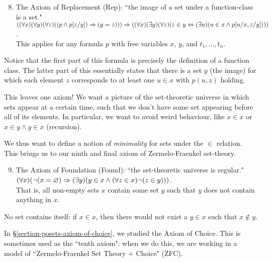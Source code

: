 \documentclass{article}
\begin{document}
\begin{enumerate}
	\setcounter{enumi}{7}
    \item The Axiom of Replacement (Rep): ``the image of a set under a function-class is a set." \\
    $((\forall x)(\forall y)(\forall z)((p \land p[z/y]) \Rightarrow (y = z))) \Rightarrow ((\forall x)(\exists y)(\forall z)(z \in y \Leftrightarrow (\exists u)(u \in x \land p[u/x, z/y])))$. \\
    This applies for any formula $p$ with free variables $x$, $y$, and $t_1, \dots, t_n$.
\end{enumerate}

Notice that the first part of this formula is precisely the definition of a function class. The latter part of this essentially states that there is a set $y$ (the image) for which each element $z$ corresponds to at least one $u \in x$ with $p(u, z)$ holding.

This leaves one axiom! We want a picture of the set-theoretic universe in which sets appear at a certain time, such that we don't have some set appearing before all of its elements. In particular, we want to avoid weird behaviour, like $x \in x$ or $x \in y \land y \in x$ (recursion).

We thus want to define a notion of \textit{minimality} for sets under the $\in$ relation. This brings us to our ninth  and final axiom of Zermelo-Fraenkel set-theory.

\begin{enumerate}
	\setcounter{enumi}{8}
    \item The Axiom of Foundation (Found): ``the set-theoretic universe is regular." \\
    $(\forall x)(\lnot (x = \varnothing) \Rightarrow (\exists y)(y \in x \land (\forall z \in x)\lnot (z \in y)))$. \\
    That is, all non-empty sets $x$ contain some set $y$ such that $y$ does not contain anything in $x$.
\end{enumerate}

\begin{corollary}
    No set contains itself: if $x \in x$, then there would not exist a $y \in x$ such that $x \notin y$.
\end{corollary}

In \S\ref{section-posets-axiom-of-choice}, we studied the Axiom of Choice. This is sometimes used as the ``tenth axiom": when we do this, we are working in a model of ``Zermelo-Fraenkel Set Theory + Choice" (ZFC).
\end{document}

